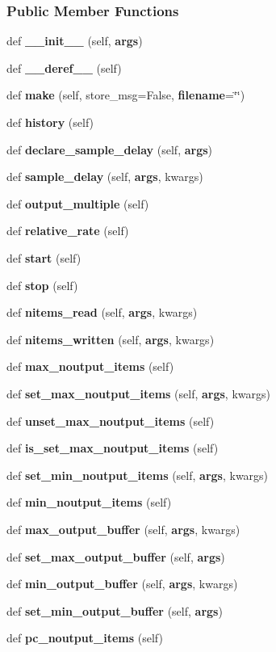 \subsubsection*{Public Member Functions}
\begin{DoxyCompactItemize}
\item 
def {\bf \+\_\+\+\_\+init\+\_\+\+\_\+} (self, {\bf args})
\item 
def {\bf \+\_\+\+\_\+deref\+\_\+\+\_\+} (self)
\item 
def {\bf make} (self, store\+\_\+msg=False, {\bf filename}=\char`\"{}\char`\"{})
\item 
def {\bf history} (self)
\item 
def {\bf declare\+\_\+sample\+\_\+delay} (self, {\bf args})
\item 
def {\bf sample\+\_\+delay} (self, {\bf args}, kwargs)
\item 
def {\bf output\+\_\+multiple} (self)
\item 
def {\bf relative\+\_\+rate} (self)
\item 
def {\bf start} (self)
\item 
def {\bf stop} (self)
\item 
def {\bf nitems\+\_\+read} (self, {\bf args}, kwargs)
\item 
def {\bf nitems\+\_\+written} (self, {\bf args}, kwargs)
\item 
def {\bf max\+\_\+noutput\+\_\+items} (self)
\item 
def {\bf set\+\_\+max\+\_\+noutput\+\_\+items} (self, {\bf args}, kwargs)
\item 
def {\bf unset\+\_\+max\+\_\+noutput\+\_\+items} (self)
\item 
def {\bf is\+\_\+set\+\_\+max\+\_\+noutput\+\_\+items} (self)
\item 
def {\bf set\+\_\+min\+\_\+noutput\+\_\+items} (self, {\bf args}, kwargs)
\item 
def {\bf min\+\_\+noutput\+\_\+items} (self)
\item 
def {\bf max\+\_\+output\+\_\+buffer} (self, {\bf args}, kwargs)
\item 
def {\bf set\+\_\+max\+\_\+output\+\_\+buffer} (self, {\bf args})
\item 
def {\bf min\+\_\+output\+\_\+buffer} (self, {\bf args}, kwargs)
\item 
def {\bf set\+\_\+min\+\_\+output\+\_\+buffer} (self, {\bf args})
\item 
def {\bf pc\+\_\+noutput\+\_\+items} (self)
\item 

\end{DoxyCompactItemize}
